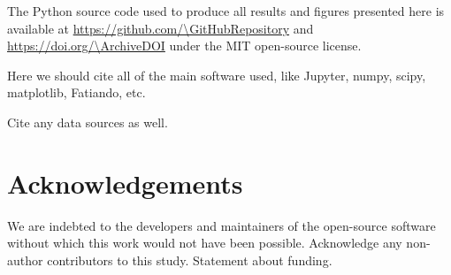 The Python source code used to produce all results and figures presented here
is available at \url{https://github.com/\GitHubRepository} and
\url{https://doi.org/\ArchiveDOI} under the MIT open-source license.

Here we should cite all of the main software used, like Jupyter, numpy, scipy,
matplotlib, Fatiando, etc.

Cite any data sources as well.

\section{Acknowledgements}

We are indebted to the developers and maintainers of the open-source software
without which this work would not have been possible.
Acknowledge any non-author contributors to this study.
Statement about funding.

